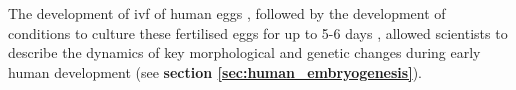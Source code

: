 The development of 
\gls{ivf}
of human eggs \cite{edwards1969early, rock1944vitro, shettles1955morula}, followed by the development of conditions to culture these fertilised eggs for up to 5-6 days \cite{edwards1970fertilization, steptoe1971human},
allowed scientists to describe the dynamics of key morphological and genetic changes during early human development (see \textbf{section \ref{sec:human_embryogenesis}}).
\\



